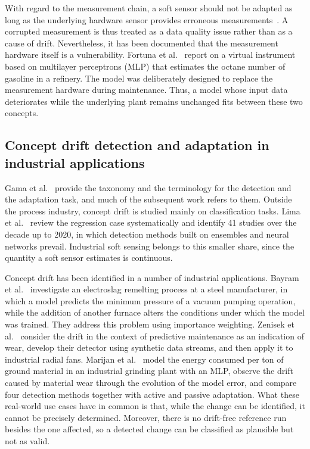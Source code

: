 %
With regard to the measurement chain, a soft sensor should not be adapted as long as the underlying hardware sensor provides erroneous measurements~\cite{kadlec.2011}. A corrupted measurement is thus treated as a data quality issue rather than as a cause of drift. Nevertheless, it has been documented that the measurement hardware itself is a vulnerability. Fortuna et al.~\cite{fortuna.2007b} report on a virtual instrument based on multilayer perceptrons (MLP) that estimates the octane number of gasoline in a refinery. The model was deliberately designed to replace the measurement hardware during maintenance. Thus, a model whose input data deteriorates while the underlying plant remains unchanged fits between these two concepts. \par
%

\subsection{Concept drift detection and adaptation in industrial applications} \label{subsec:cd_industrial}

Gama et al.~\cite{gama.2014} provide the taxonomy and the terminology for the detection and the adaptation task, and much of the subsequent work refers to them. Outside the process industry, concept drift is studied mainly on classification tasks. Lima et al.~\cite{lima.2022} review the regression case systematically and identify 41 studies over the decade up to 2020, in which detection methods built on ensembles and neural networks prevail. Industrial soft sensing belongs to this smaller share, since the quantity a soft sensor estimates is continuous. \par
%
Concept drift has been identified in a number of industrial applications. Bayram et al.~\cite{bayram.2022b} investigate an electroslag remelting process at a steel manufacturer, in which a model predicts the minimum pressure of a vacuum pumping operation, while the addition of another furnace alters the conditions under which the model was trained. They address this problem using importance weighting. Zenisek et al.~\cite{zenisek.2019} consider the drift in the context of predictive maintenance as an indication of wear, develop their detector using synthetic data streams, and then apply it to industrial radial fans. Marijan et al.~\cite{marijan.2025} model the energy consumed per ton of ground material in an industrial grinding plant with an MLP, observe the drift caused by material wear through the evolution of the model error, and compare four detection methods together with active and passive adaptation. What these real-world use cases have in common is that, while the change can be identified, it cannot be precisely determined. Moreover, there is no drift-free reference run besides the one affected, so a detected change can be classified as plausible but not as valid. \par
%

